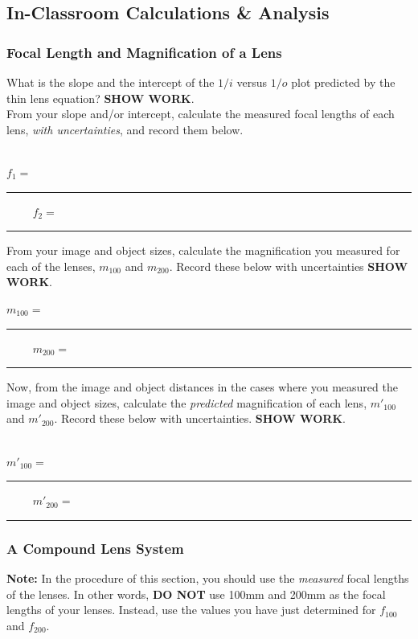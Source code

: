 
\subsection{In-Classroom Calculations \& Analysis}

\subsubsection{Focal Length and Magnification of a Lens}

\noindent What is the slope and the intercept of the $1/i$ versus $1/o$ plot predicted by the thin lens equation?
{\bf SHOW WORK}.
\vspace*{3cm}\\


\noindent From your slope and/or intercept, calculate the measured focal lengths of
each lens, {\it with uncertainties}, and record them below. \\
\vspace*{4cm}\\
\begin{center}
$f_1=$~\rule{3cm}{.1mm} ~~~~
$f_2=$~\rule{3cm}{.1mm}
\end{center}
\clearpage

\noindent
From your image and object sizes, calculate the magnification you measured for
each of the lenses, $m_{100}$ and $m_{200}.$ Record these below with
uncertainties {\bf SHOW WORK}. \\
\vspace*{3cm} 
\begin{center}
$m_{100}=$~\rule{3cm}{.1mm} ~~~~
$m_{200}=$~\rule{3cm}{.1mm}
\end{center}
\vspace*{.5cm}
\noindent 
Now, from the image and object distances in the cases where you measured the
image and object sizes, calculate the {\it predicted} magnification of each lens,
$m'_{100}$ and $m'_{200}.$ Record these below with uncertainties. {\bf SHOW WORK}. \\
\vspace*{3cm} \\
\begin{center}
$m'_{100}=$~\rule{3cm}{.1mm} ~~~~
$m'_{200}=$~\rule{3cm}{.1mm}
\end{center}

\subsubsection{A Compound Lens System}
{\bf Note:} In the procedure of this section, you should use the {\it measured}
focal lengths of the lenses. In other words, {\bf DO NOT} use 100mm and 200mm
as the focal lengths of your lenses. Instead, use the values you have just
determined for $f_{100}$ and $f_{200}.$\\ 


